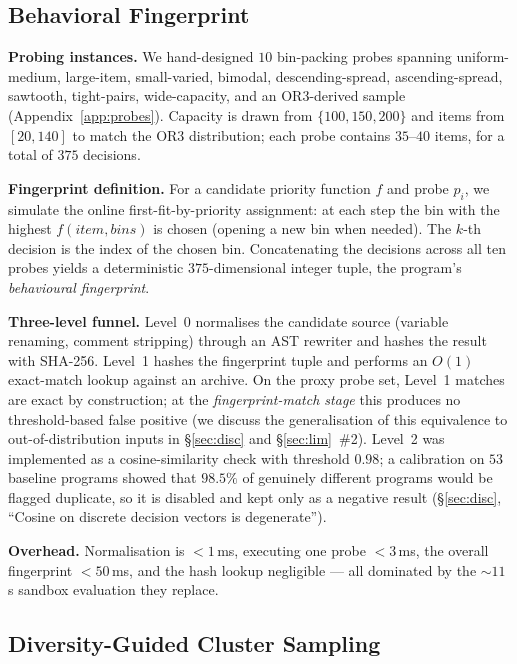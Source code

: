 \documentclass{article}
\begin{document}
\subsection{Behavioral Fingerprint}
\label{sec:fp}

\textbf{Probing instances.} We hand-designed $10$ bin-packing probes spanning
uniform-medium, large-item, small-varied, bimodal, descending-spread, ascending-spread,
sawtooth, tight-pairs, wide-capacity, and an OR3-derived sample (Appendix~\ref{app:probes}).
Capacity is drawn from $\{100,150,200\}$ and items from $[20,140]$ to match the OR3
distribution; each probe contains $35$--$40$ items, for a total of $375$ decisions.

\textbf{Fingerprint definition.} For a candidate priority function $f$ and probe
$p_i$, we simulate the online first-fit-by-priority assignment: at each step the bin
with the highest $f(item,bins)$ is chosen (opening a new bin when needed). The
$k$-th decision is the index of the chosen bin. Concatenating the decisions across all
ten probes yields a deterministic $375$-dimensional integer tuple, the program's
\emph{behavioural fingerprint}.

\textbf{Three-level funnel.} Level~0 normalises the candidate source (variable
renaming, comment stripping) through an AST rewriter and hashes the result with
SHA-256. Level~1 hashes the fingerprint tuple and performs an $O(1)$ exact-match
lookup against an archive. On the proxy probe set, Level~1 matches are exact by
construction; at the \emph{fingerprint-match stage} this produces no threshold-based
false positive (we discuss the generalisation of this equivalence to out-of-distribution
inputs in \S\ref{sec:disc} and \S\ref{sec:lim}~\#2).
Level~2 was implemented as a cosine-similarity check with threshold $0.98$; a
calibration on $53$ baseline programs showed that $98.5\%$ of genuinely different
programs would be flagged duplicate, so it is disabled and kept only as a negative
result (\S\ref{sec:disc}, ``Cosine on discrete decision vectors is degenerate'').

\textbf{Overhead.} Normalisation is $<1$\,ms, executing one probe $<3$\,ms, the
overall fingerprint $<50$\,ms, and the hash lookup negligible --- all dominated by
the $\sim 11$\,s sandbox evaluation they replace.

\subsection{Diversity-Guided Cluster Sampling}
\label{sec:div}
\end{document}
